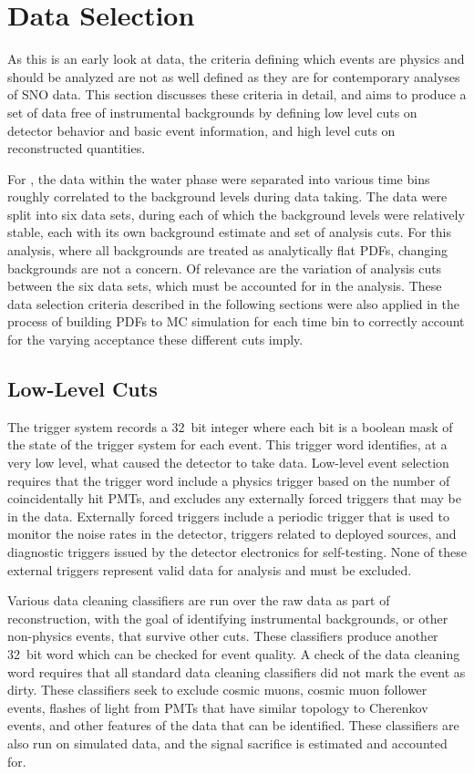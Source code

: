 \section{Data Selection}

As this is an early look at {\snop} data, the criteria defining which events are physics and should be analyzed are not as well defined as they are for contemporary analyses of SNO data.
This section discusses these criteria in detail, and aims to produce a set of data free of instrumental backgrounds by defining low level cuts on detector behavior and basic event information, and high level cuts on reconstructed quantities.

For {\snop}, the data within the water phase were separated into various time bins roughly correlated to the background levels during data taking.
The data were split into six data sets, during each of which the background levels were relatively stable, each with its  own  background  estimate  and  set  of  analysis cuts.
For this analysis, where all backgrounds are treated as analytically flat PDFs, changing backgrounds are not a concern.
Of relevance are the variation of analysis cuts between the six data sets, which must be accounted for in the analysis.
These data selection criteria described in the following sections were also applied in the process of building PDFs to MC simulation for each time bin to correctly account for the varying acceptance these different cuts imply.

\subsection{Low-Level Cuts}

The {\snop} trigger system records a 32~bit integer where each bit is a boolean mask of the state of the trigger system for each event.
This trigger word identifies, at a very low level, what caused the detector to take data.
Low-level event selection requires that the trigger word include a physics trigger based on the number of coincidentally hit PMTs, and excludes any externally forced triggers that may be in the data.
Externally forced triggers include a periodic trigger that is used to monitor the noise rates in the detector, triggers related to deployed sources, and diagnostic triggers issued by the detector electronics for self-testing.
None of these external triggers represent valid data for analysis and must be excluded.

Various data cleaning classifiers are run over the raw data as part of reconstruction, with the goal of identifying instrumental backgrounds, or other non-physics events, that survive other cuts.
These classifiers produce another 32~bit word which can be checked for event quality.
A check of the data cleaning word requires that all standard data cleaning classifiers did not mark the event as dirty.
These classifiers seek to exclude cosmic muons, cosmic muon follower events, flashes of light from PMTs that have similar topology to Cherenkov events, and other features of the data that can be identified.
These classifiers are also run on simulated data, and the signal sacrifice is estimated and accounted for. 

